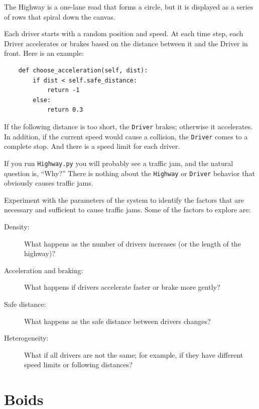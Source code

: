\documentclass[10pt]{book}
\begin{document}
The Highway is a one-lane road that forms a circle, but it is displayed
as a series of rows that spiral down the canvas.

Each driver starts with a random position and speed.  At each time
step, each Driver accelerates or brakes based on the distance between
it and the Driver in front.  Here is an example:

\begin{verbatim}
    def choose_acceleration(self, dist):
        if dist < self.safe_distance:
            return -1
        else:
            return 0.3
\end{verbatim}

If the following distance is too short, the {\tt Driver} brakes;
otherwise it accelerates.  In addition, if the current speed would
cause a collision, the {\tt Driver} comes to a complete stop.
And there is a speed limit for each driver.

If you run {\tt Highway.py} you will probably see a traffic jam,
and the natural question is, ``Why?''  There is nothing about the
{\tt Highway} or {\tt Driver} behavior that obviously causes
traffic jams.

\begin{ex}

Experiment with the parameters of the system to identify the factors
that are necessary and sufficient to cause traffic jams.  Some of
the factors to explore are:

\begin{description}

\item[Density:] What happens as the number of drivers increases (or
the length of the highway)?

\item[Acceleration and braking:]  What happens if drivers accelerate
faster or brake more gently?

\item[Safe distance:] What happens as the safe distance between drivers
changes?

\item[Heterogeneity:] What if all drivers are not the same; for
example, if they have different speed limits or following distances?

\end{description}

\end{ex}


\section{Boids}
\end{document}

